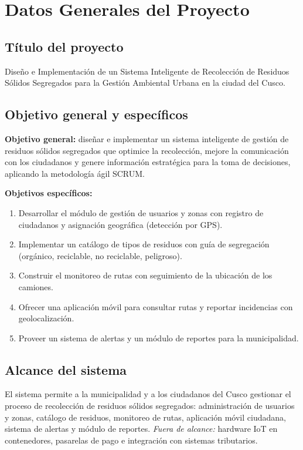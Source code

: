 \documentclass[11pt,a4paper]{article}
\begin{document}
\newpage

\tableofcontents
\newpage

\section{Datos Generales del Proyecto}

\subsection{Título del proyecto}
Diseño e Implementación de un Sistema Inteligente de Recolección de Residuos Sólidos Segregados para la Gestión Ambiental Urbana en la ciudad del Cusco.

\subsection{Objetivo general y específicos}
\textbf{Objetivo general:} diseñar e implementar un sistema inteligente de gestión de residuos sólidos segregados que optimice la recolección, mejore la comunicación con los ciudadanos y genere información estratégica para la toma de decisiones, aplicando la metodología ágil SCRUM.

\textbf{Objetivos específicos:}
\begin{enumerate}[leftmargin=*]
    \item Desarrollar el módulo de gestión de usuarios y zonas con registro de ciudadanos y asignación geográfica (detección por GPS).
    \item Implementar un catálogo de tipos de residuos con guía de segregación (orgánico, reciclable, no reciclable, peligroso).
    \item Construir el monitoreo de rutas con seguimiento de la ubicación de los camiones.
    \item Ofrecer una aplicación móvil para consultar rutas y reportar incidencias con geolocalización.
    \item Proveer un sistema de alertas y un módulo de reportes para la municipalidad.
\end{enumerate}

\subsection{Alcance del sistema}
El sistema permite a la municipalidad y a los ciudadanos del Cusco gestionar el proceso de recolección de residuos sólidos segregados: administración de usuarios y zonas, catálogo de residuos, monitoreo de rutas, aplicación móvil ciudadana, sistema de alertas y módulo de reportes. \textit{Fuera de alcance:} hardware IoT en contenedores, pasarelas de pago e integración con sistemas tributarios.
\end{document}
